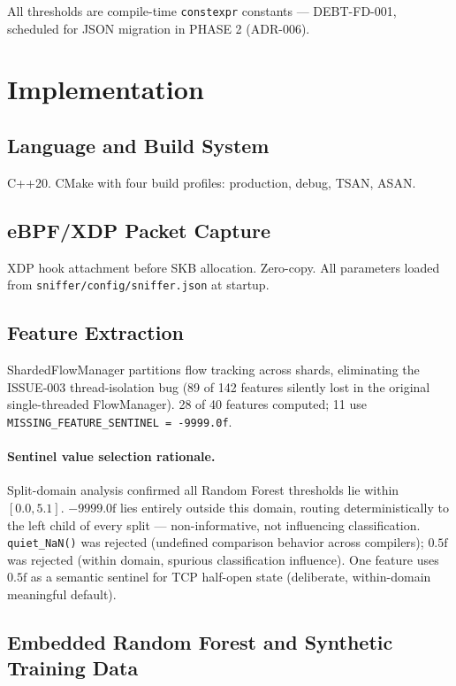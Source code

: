 \documentclass[11pt,a4paper]{article}
\begin{document}
All thresholds are compile-time \texttt{constexpr} constants --- DEBT-FD-001, scheduled for
JSON migration in PHASE 2 (ADR-006).

\section{Implementation}

\subsection{Language and Build System}
C++20. CMake with four build profiles: production, debug, TSAN, ASAN.

\subsection{eBPF/XDP Packet Capture}
XDP hook attachment before SKB allocation. Zero-copy. All parameters loaded from
\texttt{sniffer/config/sniffer.json} at startup.

\subsection{Feature Extraction}

ShardedFlowManager partitions flow tracking across shards, eliminating the ISSUE-003
thread-isolation bug (89 of 142 features silently lost in the original single-threaded
FlowManager). 28 of 40 features computed; 11 use
\texttt{MISSING\_FEATURE\_SENTINEL = -9999.0f}.

\paragraph{Sentinel value selection rationale.}
Split-domain analysis confirmed all Random Forest thresholds lie within $[0.0, 5.1]$.
$-9999.0\text{f}$ lies entirely outside this domain, routing deterministically to the left
child of every split --- non-informative, not influencing classification.
\texttt{quiet\_NaN()} was rejected (undefined comparison behavior across compilers);
$0.5\text{f}$ was rejected (within domain, spurious classification influence). One feature
uses $0.5\text{f}$ as a semantic sentinel for TCP half-open state (deliberate,
within-domain meaningful default).

\subsection{Embedded Random Forest and Synthetic Training Data}
\end{document}
